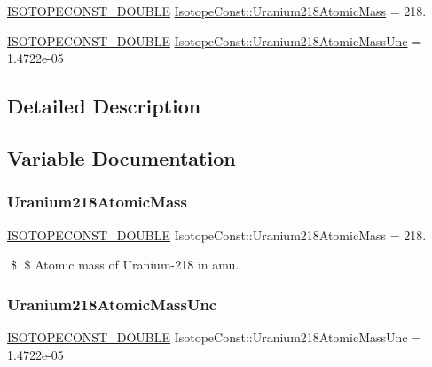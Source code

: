 \begin{DoxyCompactItemize}
\item 
\mbox{\hyperlink{group___isotope_const-_macros_ga8f45a7272ce02c0b4c65c44636ed719a}{I\+S\+O\+T\+O\+P\+E\+C\+O\+N\+S\+T\+\_\+\+D\+O\+U\+B\+LE}} \mbox{\hyperlink{group___isotope_const-_uranium-_u218_gae8a13e1e41581c0ccf446a7d8e4df39f}{Isotope\+Const\+::\+Uranium218\+Atomic\+Mass}} = 218.
\item 
\mbox{\hyperlink{group___isotope_const-_macros_ga8f45a7272ce02c0b4c65c44636ed719a}{I\+S\+O\+T\+O\+P\+E\+C\+O\+N\+S\+T\+\_\+\+D\+O\+U\+B\+LE}} \mbox{\hyperlink{group___isotope_const-_uranium-_u218_ga079dadbcb96912f042cb91d311b1e9f2}{Isotope\+Const\+::\+Uranium218\+Atomic\+Mass\+Unc}} = 1.\+4722e-\/05
\end{DoxyCompactItemize}


\subsection{Detailed Description}


\subsection{Variable Documentation}
\mbox{\label{group___isotope_const-_uranium-_u218_gae8a13e1e41581c0ccf446a7d8e4df39f}} 
\subsubsection{\texorpdfstring{Uranium218\+Atomic\+Mass}{Uranium218AtomicMass}}
{\footnotesize\ttfamily \mbox{\hyperlink{group___isotope_const-_macros_ga8f45a7272ce02c0b4c65c44636ed719a}{I\+S\+O\+T\+O\+P\+E\+C\+O\+N\+S\+T\+\_\+\+D\+O\+U\+B\+LE}} Isotope\+Const\+::\+Uranium218\+Atomic\+Mass = 218.}

\$ \$ Atomic mass of Uranium-\/218 in amu. \mbox{\label{group___isotope_const-_uranium-_u218_ga079dadbcb96912f042cb91d311b1e9f2}} 
\subsubsection{\texorpdfstring{Uranium218\+Atomic\+Mass\+Unc}{Uranium218AtomicMassUnc}}
{\footnotesize\ttfamily \mbox{\hyperlink{group___isotope_const-_macros_ga8f45a7272ce02c0b4c65c44636ed719a}{I\+S\+O\+T\+O\+P\+E\+C\+O\+N\+S\+T\+\_\+\+D\+O\+U\+B\+LE}} Isotope\+Const\+::\+Uranium218\+Atomic\+Mass\+Unc = 1.\+4722e-\/05}

